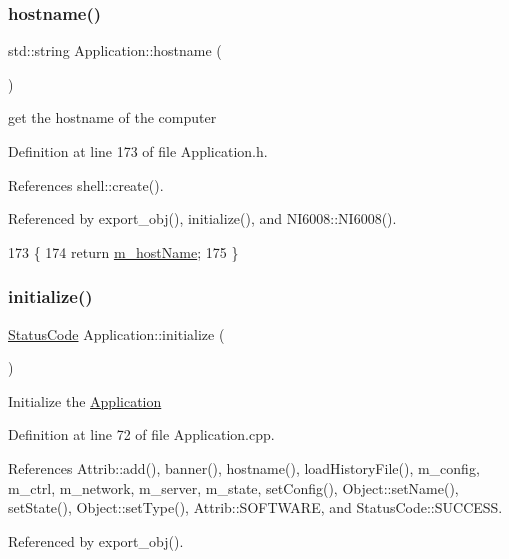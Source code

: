 \subsubsection{\texorpdfstring{hostname()}{hostname()}}
{\footnotesize\ttfamily std\+::string Application\+::hostname (\begin{DoxyParamCaption}{ }\end{DoxyParamCaption})\hspace{0.3cm}{\ttfamily [inline]}}

get the hostname of the computer 

Definition at line 173 of file Application.\+h.



References shell\+::create().



Referenced by export\+\_\+obj(), initialize(), and N\+I6008\+::\+N\+I6008().


\begin{DoxyCode}
173                       \{
174     \textcolor{keywordflow}{return} \hyperlink{classApplication_a20094c2bf311e2046942eeeec4a11f02}{m\_hostName};
175   \}
\end{DoxyCode}
\mbox{\label{classApplication_a86b8cbb104f3e04516ef574e5822ff82}} 
\subsubsection{\texorpdfstring{initialize()}{initialize()}}
{\footnotesize\ttfamily \hyperlink{classStatusCode}{Status\+Code} Application\+::initialize (\begin{DoxyParamCaption}{ }\end{DoxyParamCaption})}

Initialize the \hyperlink{classApplication}{Application} 

Definition at line 72 of file Application.\+cpp.



References Attrib\+::add(), banner(), hostname(), load\+History\+File(), m\+\_\+config, m\+\_\+ctrl, m\+\_\+network, m\+\_\+server, m\+\_\+state, set\+Config(), Object\+::set\+Name(), set\+State(), Object\+::set\+Type(), Attrib\+::\+S\+O\+F\+T\+W\+A\+RE, and Status\+Code\+::\+S\+U\+C\+C\+E\+SS.



Referenced by export\+\_\+obj().


